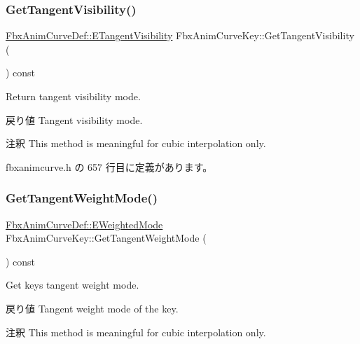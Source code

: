 \subsubsection{\texorpdfstring{Get\+Tangent\+Visibility()}{GetTangentVisibility()}}
{\footnotesize\ttfamily \hyperlink{class_fbx_anim_curve_def_a70c49072776ac6b3426c57dd80e16e3b}{Fbx\+Anim\+Curve\+Def\+::\+E\+Tangent\+Visibility} Fbx\+Anim\+Curve\+Key\+::\+Get\+Tangent\+Visibility (\begin{DoxyParamCaption}{ }\end{DoxyParamCaption}) const\hspace{0.3cm}{\ttfamily [inline]}}

Return tangent visibility mode. \begin{DoxyReturn}{戻り値}
Tangent visibility mode. 
\end{DoxyReturn}
\begin{DoxyRemark}{注釈}
This method is meaningful for cubic interpolation only. 
\end{DoxyRemark}


 fbxanimcurve.\+h の 657 行目に定義があります。

\mbox{\label{class_fbx_anim_curve_key_a6971443814d64229442becc934315c56}} 
\subsubsection{\texorpdfstring{Get\+Tangent\+Weight\+Mode()}{GetTangentWeightMode()}}
{\footnotesize\ttfamily \hyperlink{class_fbx_anim_curve_def_aeee6e9cc12501e10dbd3e5caaf66990e}{Fbx\+Anim\+Curve\+Def\+::\+E\+Weighted\+Mode} Fbx\+Anim\+Curve\+Key\+::\+Get\+Tangent\+Weight\+Mode (\begin{DoxyParamCaption}{ }\end{DoxyParamCaption}) const\hspace{0.3cm}{\ttfamily [inline]}}

Get key\textquotesingle{}s tangent weight mode. \begin{DoxyReturn}{戻り値}
Tangent weight mode of the key. 
\end{DoxyReturn}
\begin{DoxyRemark}{注釈}
This method is meaningful for cubic interpolation only. 
\end{DoxyRemark}


